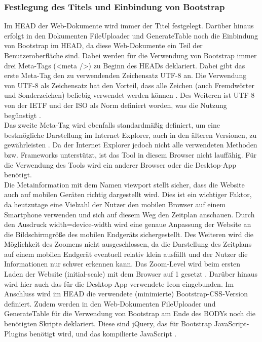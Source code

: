 \subsubsection{Festlegung des Titels und Einbindung von Bootstrap}
Im HEAD der Web-Dokumente wird immer der Titel festgelegt. 
Darüber hinaus erfolgt in den Dokumenten FileUploader und GenerateTable noch die Einbindung von Bootstrap im HEAD, da diese Web-Dokumente ein Teil der Benutzeroberfläche sind. 
Dabei werden für die Verwendung von Bootstrap immer drei Meta-Tags (<meta />) zu Beginn des HEADs deklariert. 
Dabei gibt das erste Meta-Tag den zu verwendenden Zeichensatz \ac{UTF-8} an. Die Verwendung von UTF-8 als Zeichensatz hat den Vorteil, dass alle Zeichen (auch Fremdwörter und Sonderzeichen) beliebig verwendet werden können \cite{kodierung}. Des Weiteren ist UTF-8 von der \ac{IETF} und der \ac{ISO} als Norm definiert worden, was die Nutzung begünstigt \cite{utf8}. \\
Das zweite Meta-Tag wird ebenfalls standardmäßig definiert, um eine bestmögliche Darstellung im Internet Explorer, auch in den älteren Versionen, zu gewährleisten \cite{meta}.  Da der Internet Explorer jedoch nicht alle verwendeten Methoden bzw. Frameworks unterstützt, ist das Tool in diesem Browser nicht lauffähig. Für die Verwendung des Tools wird ein anderer Browser oder die Desktop-App benötigt.\\
Die Metainformation mit dem Namen viewport stellt sicher, dass die Website auch auf mobilen Geräten richtig dargestellt wird. Dies ist ein wichtiger Faktor, da heutzutage eine Vielzahl der Nutzer den mobilen Browser auf einem Smartphone verwenden und sich auf diesem Weg den Zeitplan anschauen. Durch den Ausdruck width=device-width wird eine genaue Anpassung der Website an die Bildschirmgröße des mobilen Endgeräts sichergestellt. Des Weiteren wird die Möglichkeit des Zoomens nicht ausgeschlossen, da die Darstellung des Zeitplans auf einem mobilen Endgerät eventuell relativ klein ausfällt und der Nutzer die Informationen nur schwer erkennen kann. Das Zoom-Level wird beim ersten Laden der Website (initial-scale) mit dem Browser auf 1 gesetzt \cite{meta3}. Darüber hinaus wird hier auch das für die Desktop-App verwendete Icon eingebunden.
Im Anschluss wird im HEAD die verwendete (minimierte) Bootstrap-CSS-Version definiert. 
Zudem werden in den Web-Dokumenten FileUploader und GenerateTable für die Verwendung von Bootstrap am Ende des BODYs noch die benötigten Skripte deklariert. Diese sind jQuery, das für Bootstrap JavaScript-Plugins benötigt wird, und das kompilierte JavaScript \cite{plugin}. 

